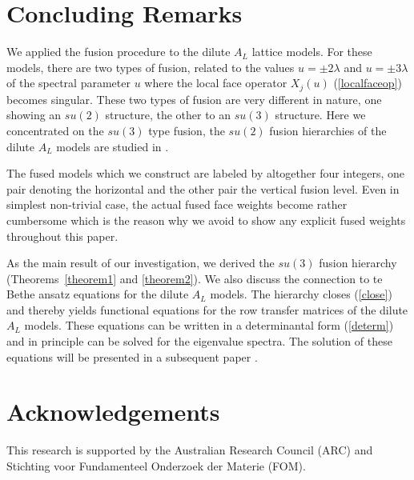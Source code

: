 \section{Concluding Remarks}
\setcounter{equation}{0}

We applied the fusion procedure to the dilute $A_L$ lattice models.
For these models, there are two types of fusion, related to the
values $u=\pm 2\lambda$ and $u=\pm 3\lambda$ of the spectral parameter $u$
where the local face operator $X_j(u)$ (\ref{localfaceop}) becomes singular.
These two types of fusion are very different in nature, one showing
an $su(2)$ structure, the other to an $su(3)$ structure. Here we concentrated
on the $su(3)$ type fusion, the $su(2)$ fusion hierarchies of the
dilute $A_L$ models are studied in \cite{Zhou:94}.

The fused models which we construct are labeled by altogether four integers,
one pair denoting the horizontal and the other pair the vertical fusion level.
Even in simplest non-trivial case, the actual fused face weights become
rather cumbersome which is the reason why we avoid to show any explicit
fused weights throughout this paper.

As the main result of our investigation, we derived the $su(3)$
fusion hierarchy (Theorems~\ref{theorem1} and \ref{theorem2}).
We also discuss the connection to te Bethe ansatz equations for the
dilute $A_L$ models. The hierarchy closes (\ref{close}) and thereby
yields functional equations for the row transfer matrices of the dilute
$A_L$ models. These equations can be written in a determinantal form
(\ref{determ}) and in principle can be solved for the eigenvalue spectra.
The solution of these equations will be presented in a subsequent
paper \cite{ZhPe:95}.

\section*{Acknowledgements}
This research is supported by the Australian Research Council (ARC) and
Stichting voor Fundamenteel Onderzoek der Materie (FOM).

